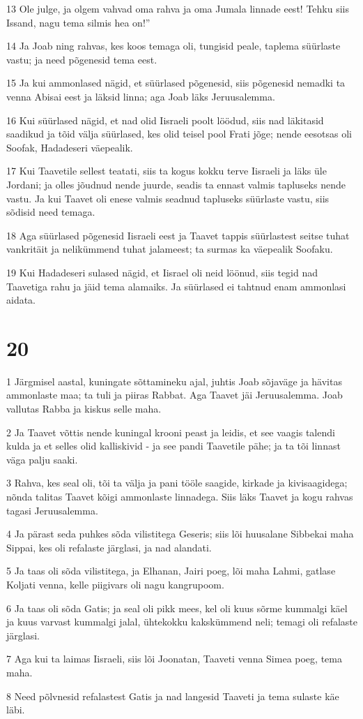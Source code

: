 \par 13 Ole julge, ja olgem vahvad oma rahva ja oma Jumala linnade eest! Tehku siis Issand, nagu tema silmis hea on!”
\par 14 Ja Joab ning rahvas, kes koos temaga oli, tungisid peale, taplema süürlaste vastu; ja need põgenesid tema eest.
\par 15 Ja kui ammonlased nägid, et süürlased põgenesid, siis põgenesid nemadki ta venna Abisai eest ja läksid linna; aga Joab läks Jeruusalemma.
\par 16 Kui süürlased nägid, et nad olid Iisraeli poolt löödud, siis nad läkitasid saadikud ja tõid välja süürlased, kes olid teisel pool Frati jõge; nende eesotsas oli Soofak, Hadadeseri väepealik.
\par 17 Kui Taavetile sellest teatati, siis ta kogus kokku terve Iisraeli ja läks üle Jordani; ja olles jõudnud nende juurde, seadis ta ennast valmis tapluseks nende vastu. Ja kui Taavet oli enese valmis seadnud tapluseks süürlaste vastu, siis sõdisid need temaga.
\par 18 Aga süürlased põgenesid Iisraeli eest ja Taavet tappis süürlastest seitse tuhat vankritäit ja nelikümmend tuhat jalameest; ta surmas ka väepealik Soofaku.
\par 19 Kui Hadadeseri sulased nägid, et Iisrael oli neid löönud, siis tegid nad Taavetiga rahu ja jäid tema alamaiks. Ja süürlased ei tahtnud enam ammonlasi aidata.

\chapter{20}

\par 1 Järgmisel aastal, kuningate sõttamineku ajal, juhtis Joab sõjaväge ja hävitas ammonlaste maa; ta tuli ja piiras Rabbat. Aga Taavet jäi Jeruusalemma. Joab vallutas Rabba ja kiskus selle maha.
\par 2 Ja Taavet võttis nende kuningal krooni peast ja leidis, et see vaagis talendi kulda ja et selles olid kalliskivid - ja see pandi Taavetile pähe; ja ta tõi linnast väga palju saaki.
\par 3 Rahva, kes seal oli, tõi ta välja ja pani tööle saagide, kirkade ja kivisaagidega; nõnda talitas Taavet kõigi ammonlaste linnadega. Siis läks Taavet ja kogu rahvas tagasi Jeruusalemma.
\par 4 Ja pärast seda puhkes sõda vilistitega Geseris; siis lõi huusalane Sibbekai maha Sippai, kes oli refalaste järglasi, ja nad alandati.
\par 5 Ja taas oli sõda vilistitega, ja Elhanan, Jairi poeg, lõi maha Lahmi, gatlase Koljati venna, kelle piigivars oli nagu kangrupoom.
\par 6 Ja taas oli sõda Gatis; ja seal oli pikk mees, kel oli kuus sõrme kummalgi käel ja kuus varvast kummalgi jalal, ühtekokku kakskümmend neli; temagi oli refalaste järglasi.
\par 7 Aga kui ta laimas Iisraeli, siis lõi Joonatan, Taaveti venna Simea poeg, tema maha.
\par 8 Need põlvnesid refalastest Gatis ja nad langesid Taaveti ja tema sulaste käe läbi.

